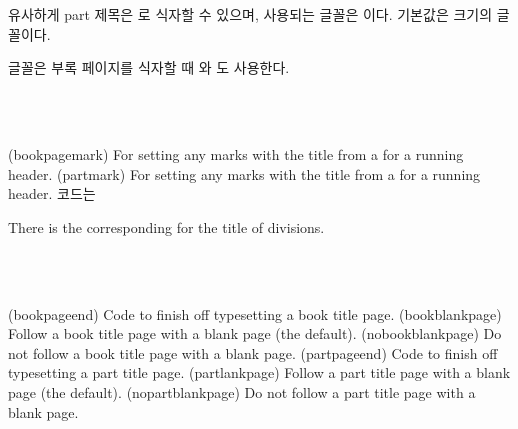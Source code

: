 유사하게 part 제목은 \cmd{\printparttitle}로 식자할 수 있으며, 사용되는 글꼴은
\cmd{\parttitlefont}이다.
기본값은 \cmd{\Huge} 크기의 \cmd{\bfseries} 글꼴이다.

\cmd{\parttitlefont} 글꼴은 부록 페이지를 식자할 때
\cmd{\appendixpage}와 \cmd{\appendixpage*}도 사용한다.

\begin{syntax}
\cmd{\bookpagemark} \\
\cmd{\partmark} \\
\end{syntax}
\glossary(bookpagemark)%
  {}%
  {For setting any marks with the title from a  for a running header.}
\glossary(partmark)%
  {}%
  {For setting any marks with the title from a  for a running header.}
\cmd{\book} 코드는
\begin{lcode}
\newcommand*{\bookpagemark}[1]{}
\end{lcode}
There is the corresponding \cmd{\partmark} for the title of \cmd{\part}
divisions.

\begin{syntax}
\cmd{\bookpageend} \cmd{\bookblankpage} \cmd{\nobookblankpage} \\
\cmd{\partpageend} \cmd{\partblankpage} \cmd{\nopartblankpage} \\
\end{syntax}
\glossary(bookpageend)%
  {}%
  {Code to finish off typesetting a book title page.}
\glossary(bookblankpage)%
  {}%
  {Follow a book title page with a blank page (the default).}
\glossary(nobookblankpage)%
  {}%
  {Do not follow a book title page with a blank page.}
\glossary(partpageend)%
  {}%
  {Code to finish off typesetting a part title page.}
\glossary(partlankpage)%
  {}%
  {Follow a part title page with a blank page (the default).}
\glossary(nopartblankpage)%
  {}%
  {Do not follow a part title page with a blank page.}

